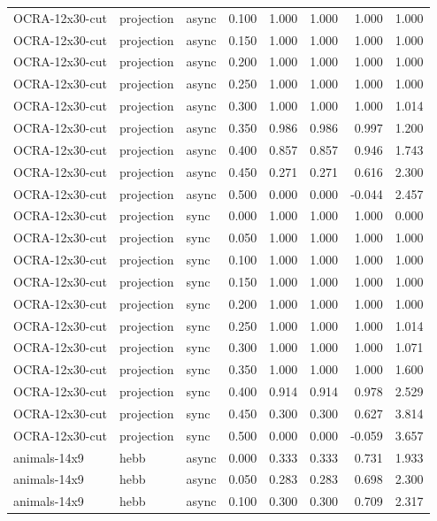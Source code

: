 \begin{tabular}{lllrrrrr}
OCRA-12x30-cut & projection & async & 0.100 & 1.000 & 1.000 & 1.000 & 1.000 \\
OCRA-12x30-cut & projection & async & 0.150 & 1.000 & 1.000 & 1.000 & 1.000 \\
OCRA-12x30-cut & projection & async & 0.200 & 1.000 & 1.000 & 1.000 & 1.000 \\
OCRA-12x30-cut & projection & async & 0.250 & 1.000 & 1.000 & 1.000 & 1.000 \\
OCRA-12x30-cut & projection & async & 0.300 & 1.000 & 1.000 & 1.000 & 1.014 \\
OCRA-12x30-cut & projection & async & 0.350 & 0.986 & 0.986 & 0.997 & 1.200 \\
OCRA-12x30-cut & projection & async & 0.400 & 0.857 & 0.857 & 0.946 & 1.743 \\
OCRA-12x30-cut & projection & async & 0.450 & 0.271 & 0.271 & 0.616 & 2.300 \\
OCRA-12x30-cut & projection & async & 0.500 & 0.000 & 0.000 & -0.044 & 2.457 \\
OCRA-12x30-cut & projection & sync & 0.000 & 1.000 & 1.000 & 1.000 & 0.000 \\
OCRA-12x30-cut & projection & sync & 0.050 & 1.000 & 1.000 & 1.000 & 1.000 \\
OCRA-12x30-cut & projection & sync & 0.100 & 1.000 & 1.000 & 1.000 & 1.000 \\
OCRA-12x30-cut & projection & sync & 0.150 & 1.000 & 1.000 & 1.000 & 1.000 \\
OCRA-12x30-cut & projection & sync & 0.200 & 1.000 & 1.000 & 1.000 & 1.000 \\
OCRA-12x30-cut & projection & sync & 0.250 & 1.000 & 1.000 & 1.000 & 1.014 \\
OCRA-12x30-cut & projection & sync & 0.300 & 1.000 & 1.000 & 1.000 & 1.071 \\
OCRA-12x30-cut & projection & sync & 0.350 & 1.000 & 1.000 & 1.000 & 1.600 \\
OCRA-12x30-cut & projection & sync & 0.400 & 0.914 & 0.914 & 0.978 & 2.529 \\
OCRA-12x30-cut & projection & sync & 0.450 & 0.300 & 0.300 & 0.627 & 3.814 \\
OCRA-12x30-cut & projection & sync & 0.500 & 0.000 & 0.000 & -0.059 & 3.657 \\
animals-14x9 & hebb & async & 0.000 & 0.333 & 0.333 & 0.731 & 1.933 \\
animals-14x9 & hebb & async & 0.050 & 0.283 & 0.283 & 0.698 & 2.300 \\
animals-14x9 & hebb & async & 0.100 & 0.300 & 0.300 & 0.709 & 2.317 \\

\end{tabular}
